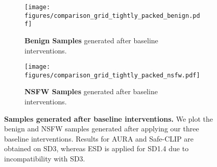     \begin{figure}[t]
        \centering
        \begin{subfigure}[b]{0.50\textwidth}
            \centering
            \texttt{[image: figures/comparison\_grid\_tightly\_packed\_benign.pdf]}
            \caption{\textbf{Benign Samples} generated after baseline interventions.}
            \label{fig:benign_samples}
        \end{subfigure}
        
        \vskip 0.3cm 
    
        \begin{subfigure}[b]{0.50\textwidth}
            \centering
            \texttt{[image: figures/comparison\_grid\_tightly\_packed\_nsfw.pdf]}
            \caption{\textbf{NSFW Samples} generated after baseline interventions.}
            \label{fig:nsfw_samples}
        \end{subfigure}
    
        \caption{\textbf{Samples generated after baseline interventions.}
        We plot the benign and NSFW samples generated after applying our three baseline interventions. 
        Results for AURA and Safe-CLIP are obtained on SD3, whereas ESD is applied for SD1.4 due to incompatibility with SD3.
        }
        
        \label{fig:baseline_samples}
    \end{figure}

